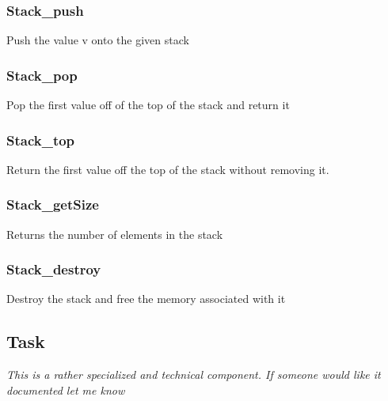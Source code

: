 \subsubsection{Stack\_push} \label{apistackpush}
 Push the value v onto the given
stack

\subsubsection{Stack\_pop} \label{apistackpop}
 Pop the first value off of the top of the
stack and return it

\subsubsection{Stack\_top} \label{apistacktop}
 Return the first value off the top of the
stack without removing it.

\subsubsection{Stack\_getSize} \label{apistacksize}
 Returns the number of elements in the
stack

\subsubsection{Stack\_destroy} \label{apistackdestroy}
 Destroy the stack and free the memory
associated with it

\subsection{Task} \label{apitask}
\textit{This is a rather specialized and technical component. If someone would like it documented let me know}
